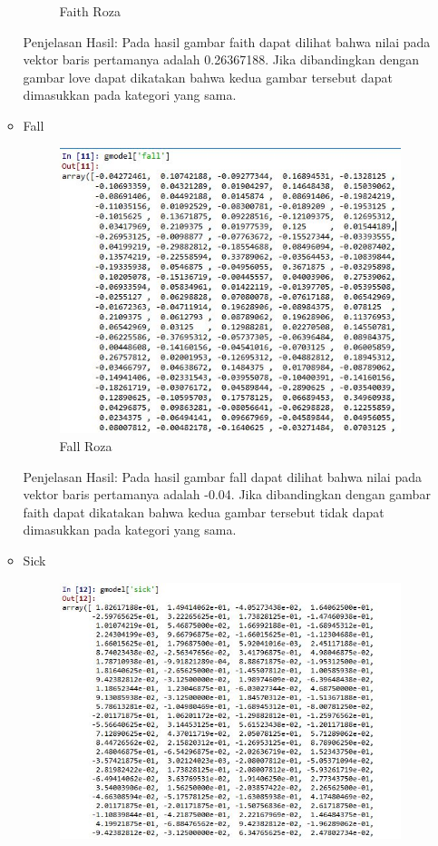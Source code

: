 \begin{enumerate}
\begin{itemize}
\begin{figure}[!hbtp]
\caption{Faith Roza}
\label{text-fadila}
\end{figure}
\par Penjelasan Hasil: Pada hasil gambar faith dapat dilihat bahwa nilai pada vektor baris pertamanya adalah 0.26367188. Jika dibandingkan dengan gambar love dapat dikatakan bahwa kedua gambar tersebut dapat dimasukkan pada kategori yang sama.
\item Fall
\begin{figure}[!hbtp]
\centering
\includegraphics[scale=0.6]{figures/fallroza.jpg}
\caption{Fall Roza}
\label{text-fadila}
\end{figure}
\par Penjelasan Hasil: Pada hasil gambar fall dapat dilihat bahwa nilai pada vektor baris pertamanya adalah -0.04. Jika dibandingkan dengan gambar faith dapat dikatakan bahwa kedua gambar tersebut tidak dapat dimasukkan pada kategori yang sama.
\item Sick
\begin{figure}[!hbtp]
\centering
\includegraphics[scale=0.6]{figures/sickroza.jpg}

\end{figure}
\end{itemize}
\end{enumerate}
